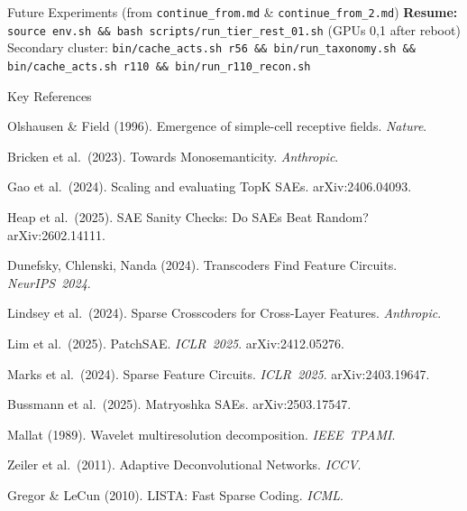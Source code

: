 \documentclass[final]{beamer}
\newlength{\colwidth}
\begin{document}
\begin{frame}[t]
\begin{columns}[t]
\begin{column}{\colwidth}
\begin{block}{Future Experiments (from \texttt{continue\_from.md} \& \texttt{continue\_from\_2.md})}
\vspace{0.3em}
{\scriptsize\textbf{Resume:} \texttt{source env.sh \&\& bash scripts/run\_tier\_rest\_01.sh} (GPUs 0,1 after reboot)\\
Secondary cluster: \texttt{bin/cache\_acts.sh r56 \&\& bin/run\_taxonomy.sh \&\& bin/cache\_acts.sh r110 \&\& bin/run\_r110\_recon.sh}}
\end{block}

\vspace{0.5em}

\begin{block}{Key References}
{\tiny
\begin{enumerate}[leftmargin=1.2em,itemsep=0pt,label={[\arabic*]}]
  \item Olshausen \& Field (1996). Emergence of simple-cell receptive fields. \textit{Nature}.
  \item Bricken et al.\ (2023). Towards Monosemanticity. \textit{Anthropic}.
  \item Gao et al.\ (2024). Scaling and evaluating TopK SAEs. arXiv:2406.04093.
  \item Heap et al.\ (2025). SAE Sanity Checks: Do SAEs Beat Random? arXiv:2602.14111.
  \item Dunefsky, Chlenski, Nanda (2024). Transcoders Find Feature Circuits. \textit{NeurIPS~2024}.
  \item Lindsey et al.\ (2024). Sparse Crosscoders for Cross-Layer Features. \textit{Anthropic}.
  \item Lim et al.\ (2025). PatchSAE. \textit{ICLR~2025}. arXiv:2412.05276.
  \item Marks et al.\ (2024). Sparse Feature Circuits. \textit{ICLR~2025}. arXiv:2403.19647.
  \item Bussmann et al.\ (2025). Matryoshka SAEs. arXiv:2503.17547.
  \item Mallat (1989). Wavelet multiresolution decomposition. \textit{IEEE~TPAMI}.
  \item Zeiler et al.\ (2011). Adaptive Deconvolutional Networks. \textit{ICCV}.
  \item Gregor \& LeCun (2010). LISTA: Fast Sparse Coding. \textit{ICML}.
\end{enumerate}
}
\end{block}

\end{column}

\end{columns}


\end{frame}
\end{document}
